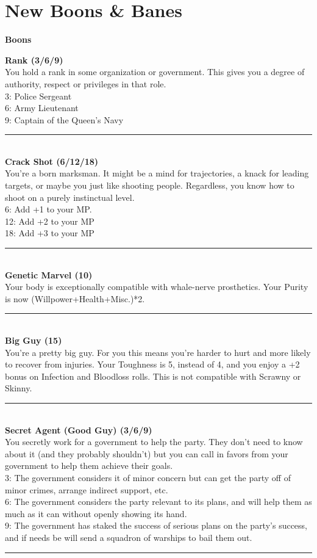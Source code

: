 \documentclass[a4paper, twocolumn, openany]{book}
\begin{document}
{\section{New Boons \& Banes}

{\Large\bfseries Boons\\}

{\bfseries Rank (3/6/9)\\}
You hold a rank in some organization or government. This gives you a degree of authority,
respect or privileges in that role.\\
3: Police Sergeant\\
6: Army Lieutenant\\
9: Captain of the Queen’s Navy\\
\hrule\ \\

{\bfseries Crack Shot (6/12/18)\\}
You’re a born marksman. It might be a mind for trajectories, a knack for leading targets, or
maybe you just like shooting people. Regardless, you know how to shoot on a purely instinctual
level.\\
6: Add +1 to your MP.\\
12: Add +2 to your MP\\
18: Add +3 to your MP\\
\hrule\ \\

{\bfseries Genetic Marvel (10)\\}
Your body is exceptionally compatible with whale-nerve prosthetics. Your Purity is now
(Willpower+Health+Misc.)*2.\\
\hrule\ \\

{\bfseries Big Guy (15)\\}
You’re a pretty big guy. For you this means you’re harder to hurt and more likely to recover from
injuries. Your Toughness is 5, instead of 4, and you enjoy a +2 bonus on Infection and
Bloodloss rolls. This is not compatible with Scrawny or Skinny.\\
\hrule\ \\

{\bfseries Secret Agent (Good Guy) (3/6/9)\\}
You secretly work for a government to help the party. They don’t need to know about it (and
they probably shouldn’t) but you can call in favors from your government to help them achieve
their goals.\\
3: The government considers it of minor concern but can get the party off of minor crimes,
arrange indirect support, etc.\\
6: The government considers the party relevant to its plans, and will help them as much as it
can without openly showing its hand.\\
9: The government has staked the success of serious plans on the party’s success, and if needs
be will send a squadron of warships to bail them out.\\
\hrule\ \\

}
\end{document}
